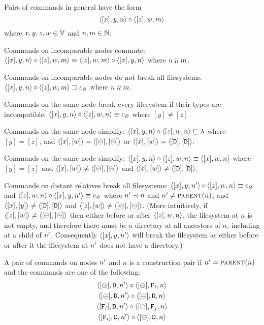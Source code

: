 
\bigskip

\noindent
Pairs of commands in general have the form
\[ \cxynv\cc  \czwmv \]
where $x,y,z,w\in\setv$ and $n,m\in\setn$. 

\begin{myax}
Commands on incomparable nodes commute:
$\cxynv\cc\czwmv \equiv \czwmv\cc\cxynv$ where $n\unrel m$.
\end{myax}

\begin{myax}
Commands on incomparable nodes do not break all filesystems:
$\wrksx{\cxynv\cc\czwmv}$ where $n\unrel m$.
\end{myax}

\begin{myax}
Commands on the same node break every filesystem if their types are incompatible:
$\cxynv\cc\czwnv \equiv \cbrk$ where $[y]\ne [z]$.
\end{myax}

\begin{myax}
Commands on the same node simplify:
$\cxynv\cc\czwnv \eqext \emptyseq$ where $[y]=[z]$, and $\cxw=\cbb$ 
or $\cxw=\cdd$.
\end{myax}

\begin{myax}
Commands on the same node simplify:
$\cxynv\cc \czwnv \equiv \cxwnv$ where $[y]=[z]$ and $\cxw\neq\cbb$ and $\cxw\neq\cdd$.
\end{myax}

\begin{myax}
Commands on distant relatives break all filesystems:
$\cxynnv\cc\czwnv \equiv \cbrk$
and $\czwnv\cc\cxynnv \equiv\cbrk$
where $\nn\descendant n$ and $\nn\neq\parent(n)$, and $\cxy\neq\cdd$ and $\czw\neq\cbb$.
(More intuitively, if $\czw\neq\cbb$ then either before or after $\czwnv$, the filesystem at
$n$ is not empty, and therefore there must be a directory at all ancestors of $n$, including at a child of $\nn$.
Consequently $\cxynnv$ will break the filesystem as either before or after it the filesystem at $\nn$
does not have a directory.)
\end{myax}

\begin{mydef}
A pair of commands on nodes $\nn$ and $n$ is a construction pair if $\nn=\parent(n)$ 
and the commands are one
of the following:
   \begin{gather*}
            \cbdaa{\nn}\cc  \cbfaa{n} \\
            \cbdaa{\nn}\cc  \cbdaa{n} \\
            \cfdaa{\nn}\cc  \caaa{\empt}{\valff}{n} \\
            \cfdaa{\nn}\cc  \cbdaa{n}
   \end{gather*}
\end{mydef}


